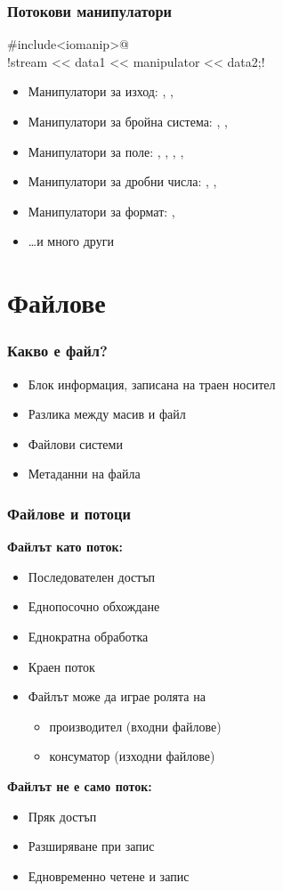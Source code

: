 \documentclass{beamer}
\begin{document}
\begin{frame}[fragile]
  \frametitle{Потокови манипулатори}

  \lst@#include<iomanip>@\\
  \lst!stream << data1 << manipulator << data2;!
  \begin{itemize}
  \item Манипулатори за изход: , , 
  \item Манипулатори за бройна система: , , 
  \item Манипулатори за поле: , , , , 
  \item Манипулатори за дробни числа: , , 
  \item Манипулатори за формат: , 
  \item \ldots и много други
  \end{itemize}
\end{frame}

\section{Файлове}

\begin{frame}
  \frametitle{Какво е файл?}

  \begin{itemize}[<+->]
  \item Блок информация, записана на траен носител
  \item Разлика между масив и файл
  \item Файлови системи
  \item Метаданни на файла
  \end{itemize}
\end{frame}

\begin{frame}
  \frametitle{Файлове и потоци}

  \textbf{Файлът като поток:}
  \begin{itemize}[<+->]
  \item Последователен достъп
  \item Еднопосочно обхождане
  \item Еднократна обработка
  \item Краен поток
  \item Файлът може да играе ролята на
    \begin{itemize}
    \item производител (входни файлове)
    \item консуматор (изходни файлове)
    \end{itemize}
  \end{itemize}

  \onslide<+->
  \textbf{Файлът не е само поток:}
  \begin{itemize}[<+->]
  \item Пряк достъп
  \item Разширяване при запис
  \item Едновременно четене и запис
  \end{itemize}
\end{frame}
\end{document}
